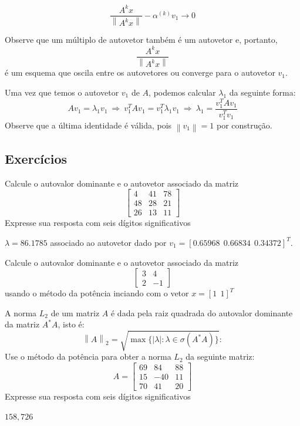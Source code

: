 $$\frac{A^k x}{\left\|A^k x\right\|}-\alpha^{(k)} v_1 \to 0$$

Observe que um múltiplo de autovetor  também é um autovetor e, portanto, 
$$
\frac{A^k x}{\left\|A^k x\right\|}
$$
é um esquema que oscila entre os autovetores ou converge para o autovetor $v_1$.


Uma vez que temos o autovetor $v_1$ de $A$, podemos calcular $\lambda_1$ da seguinte forma:
\begin{equation*}
A v_1=\lambda_1 v_1 ~\Longrightarrow~ v_1^TA v_1= v_1^T\lambda_1 v_1 ~ \Longrightarrow~ \lambda_1=\frac{v_1^TA v_1}{ v_1^Tv_1}  
\end{equation*}
Observe que a última identidade é válida, pois $\left\|v_1\right\|=1$ por construção.

\subsection*{Exercícios}

\begin{exer} Calcule o autovalor dominante e o autovetor associado da matriz
$$\left[\begin{array}{ccc}
 4&     41  &  78\\
 48   & 28&    21  \\
 26   & 13 &   11
\end{array}\right]
$$
Expresse sua resposta com seis dígitos significativos
\end{exer}
\begin{resp}
  
$\lambda=86.1785$ associado ao autovetor dado por $v_1=\left[ 0.65968~~ 0.66834~~ 0.34372\right]^T$.    
  
\end{resp}

\begin{exer}Calcule o autovalor dominante e o autovetor associado da matriz
$$
\left[\begin{array}{cc}
3&4\\2&-1
\end{array}\right]
$$
usando o método da potência inciando com o vetor $x=[1~~  1]^T$
\end{exer}

\begin{exer} A norma $L_2$ de um matriz $A$  é dada pela raiz quadrada do autovalor dominante da matriz $A^*A$, isto é: $$\left\|A\right\|_2=\sqrt{\max\{|\lambda|: \lambda\in\sigma(A^*A)\}}:$$
Use o método da potência para obter a norma $L_2$ da seguinte matriz:
$$A=\left[\begin{array}{ccc}

    69&    84&    88\\
    15&  - 40&    11\\
    70&    41&    20
\end{array}\right]
$$
Expresse sua resposta com seis dígitos significativos
\end{exer}
\begin{resp} 
  
$158,726$    
  
\end{resp}


